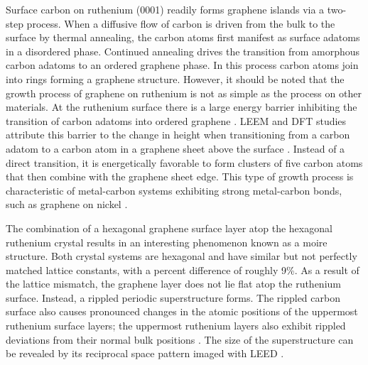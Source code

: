 Surface carbon on ruthenium (0001) readily forms graphene islands via a two-step process. When a diffusive flow of carbon is driven from the bulk to the surface by thermal annealing, the carbon atoms first manifest as surface adatoms in a disordered phase. Continued annealing drives the transition from amorphous carbon adatoms to an ordered graphene phase. In this process carbon atoms join into rings forming a graphene structure. However, it should be noted that the growth process of graphene on ruthenium is not as simple as the process on other materials. At the ruthenium surface there is a large energy barrier inhibiting the transition of carbon adatoms into ordered graphene \cite{c-clusters}. LEEM and DFT studies attribute this barrier to the change in height when transitioning from a carbon adatom to a carbon atom in a graphene sheet above the surface \cite{c-clusters}. Instead of a direct transition, it is energetically favorable to form clusters of five carbon atoms that then combine with the graphene sheet edge. This type of growth process is characteristic of metal-carbon systems exhibiting strong metal-carbon bonds, such as graphene on nickel \cite{c-clusters}.

The combination of a hexagonal graphene surface layer atop the hexagonal ruthenium crystal results in an interesting phenomenon known as a moire structure. Both crystal systems are hexagonal and have similar but not perfectly matched lattice constants, with a percent difference of roughly 9\%. As a result of the lattice mismatch, the graphene layer does not lie flat atop the ruthenium surface. Instead, a rippled periodic superstructure forms. The rippled carbon surface also causes pronounced changes in the atomic positions of the uppermost ruthenium surface layers; the uppermost ruthenium layers also exhibit rippled deviations from their normal bulk positions \cite{sxrd}.  The size of the superstructure can be revealed by its reciprocal space pattern imaged with LEED \cite{graphene-metals}. 

